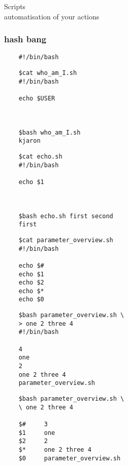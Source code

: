 \documentclass[xcolor=dvipsnames]{beamer}
\begin{document}
\begin{frame}[fragile]
	\begin{center}
		\Huge
		Scripts \\
		\Large
		automatisation of your actions
	\end{center}
\end{frame}

\begin{frame}[fragile]
\frametitle{hash bang}
\LARGE
\begin{verbatim}
	#!/bin/bash
\end{verbatim}
\end{frame}

\begin{frame}[fragile]
\LARGE
\begin{verbatim}
	$cat who_am_I.sh
	#!/bin/bash

	echo $USER



	$bash who_am_I.sh
	kjaron
\end{verbatim}
\end{frame}

\begin{frame}[fragile]
\LARGE
\begin{verbatim}
	$cat echo.sh
	#!/bin/bash

	echo $1



	$bash echo.sh first second
	first
\end{verbatim}
\end{frame}

\begin{frame}[fragile]
\LARGE
\begin{verbatim}
	$cat parameter_overview.sh
	#!/bin/bash

	echo $#
	echo $1
	echo $2
	echo $*
	echo $0
\end{verbatim}
\end{frame}

\begin{frame}[fragile]
\LARGE
\begin{verbatim}
	$bash parameter_overview.sh \
	> one 2 three 4
	#!/bin/bash

	4
	one
	2
	one 2 three 4
	parameter_overview.sh
\end{verbatim}
\end{frame}

\begin{frame}[fragile]
\LARGE
\begin{verbatim}
	$bash parameter_overview.sh \
	\ one 2 three 4

	$#     3
	$1     one
	$2     2
	$*     one 2 three 4
	$0     parameter_overview.sh
\end{verbatim}
\end{frame}
\end{document}
